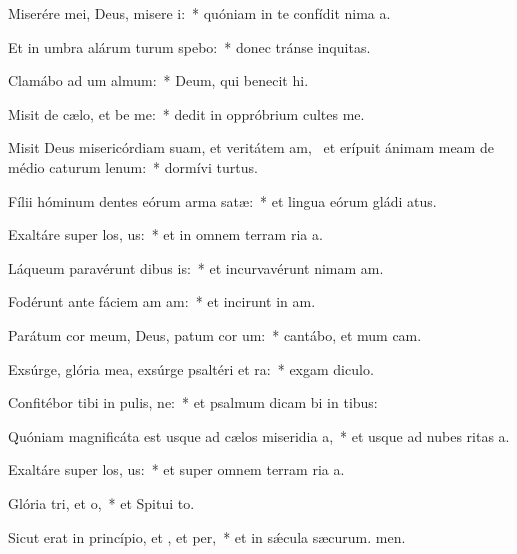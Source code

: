 \item Miserére mei, Deus, misere i:~* quóniam in te confídit nima a.
\item Et in umbra alárum turum spebo:~* donec tránse inquitas.
\item Clamábo ad um almum:~* Deum, qui benecit hi.
\item Misit de cælo, et be me:~* dedit in oppróbrium cultes me.
\item Misit Deus misericórdiam suam, et veritátem am,~\pscross{} et erípuit ánimam meam de médio caturum lenum:~* dormívi turtus.
\item Fílii hóminum dentes eórum arma  satæ:~* et lingua eórum gládi atus.
\item Exaltáre super los, us:~* et in omnem terram ria a.
\item Láqueum paravérunt dibus is:~* et incurvavérunt nimam am.
\item Fodérunt ante fáciem am am:~* et incirunt in am.
\item Parátum cor meum, Deus, patum cor um:~* cantábo, et mum cam.
\item Exsúrge, glória mea, exsúrge psaltéri et ra:~* exgam diculo.
\item Confitébor tibi in pulis, ne:~* et psalmum dicam bi in tibus:
\item Quóniam magnificáta est usque ad cælos miseridia a,~* et usque ad nubes ritas a.
\item Exaltáre super los, us:~* et super omnem terram ria a.
\item Glória tri, et o,~* et Spitui to.
\item Sicut erat in princípio, et , et per,~* et in sǽcula sæcurum. men.
